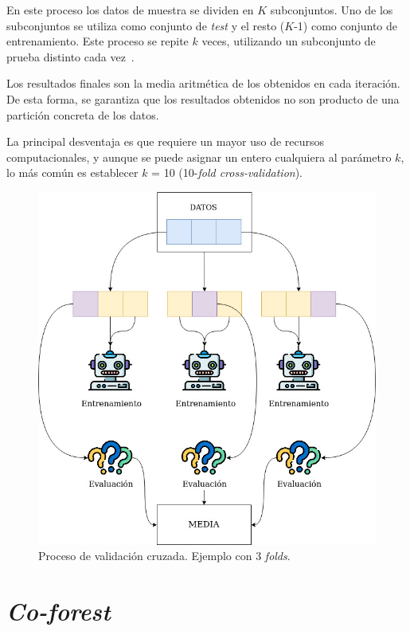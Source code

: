 En este proceso los datos de muestra se dividen en $K$ subconjuntos. Uno de los subconjuntos se utiliza como conjunto de \textit{test} y el resto ($K$-1) como conjunto de entrenamiento. Este proceso se repite $k$ veces, utilizando un subconjunto de prueba distinto cada vez~\cite{validacionCruzada}.

Los resultados finales son la media aritmética de los obtenidos en cada iteración. De esta forma, se garantiza que los resultados obtenidos no son producto de una partición concreta de los datos.

La principal desventaja es que requiere un mayor uso de recursos computacionales, y aunque se puede asignar un entero cualquiera al parámetro $k$, lo más común es establecer $k$ = 10 (10-\textit{fold cross-validation}).

\begin{figure}[h]
	\caption[Técnicas: validación cruzada]{Proceso de validación cruzada. Ejemplo con 3 \textit{folds}.}
	\label{img:val_cruz}
	\centering
	\includegraphics[scale=0.45]{../img/memoria/3_kcross_validation}
\end{figure}


\section{\textit{Co-forest}}
\label{coforest-teoria}

